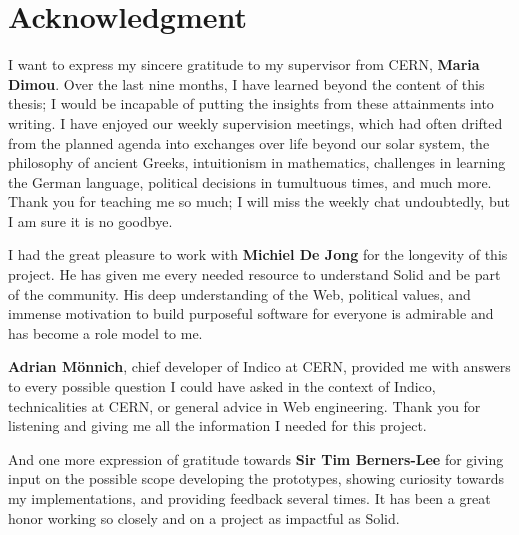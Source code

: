 \section*{Acknowledgment}

\hspace{\parindent} I want to express my sincere gratitude to my supervisor from CERN, \textbf{Maria Dimou}. Over the last nine months, I have learned beyond the content of this thesis; I would be incapable of putting the insights from these attainments into writing. I have enjoyed our weekly supervision meetings, which had often drifted from the planned agenda into exchanges over life beyond our solar system, the philosophy of ancient Greeks, intuitionism in mathematics, challenges in learning the German language, political decisions in tumultuous times, and much more. Thank you for teaching me so much; I will miss the weekly chat undoubtedly, but I am sure it is no goodbye.

\vspace{1cm}

I had the great pleasure to work with \textbf{Michiel De Jong} for the longevity of this project. He has given me every needed resource to understand Solid and be part of the community. His deep understanding of the Web, political values, and immense motivation to build purposeful software for everyone is admirable and has become a role model to me.

\vspace{1cm}

\textbf{Adrian M\"onnich}, chief developer of Indico at CERN, provided me with answers to every possible question I could have asked in the context of Indico, technicalities at CERN, or general advice in Web engineering. Thank you for listening and giving me all the information I needed for this project.

\vspace{1cm}

And one more expression of gratitude towards \textbf{Sir Tim Berners-Lee} for giving input on the possible scope developing the prototypes, showing curiosity towards my implementations, and providing feedback several times. It has been a great honor working so closely and on a project as impactful as Solid.
